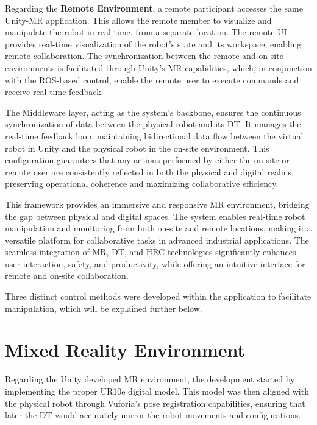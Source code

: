 Regarding the \textbf{Remote Environment}, a remote participant accesses the same Unity-\ac{MR} application. This allows the remote member to visualize and manipulate the robot in real time, from a separate location. The remote \ac{UI} provides real-time visualization of the robot’s state and its workspace, enabling remote collaboration. The synchronization between the remote and on-site environments is facilitated through Unity’s \ac{MR} capabilities, which, in conjunction with the \ac{ROS}-based control, enable the remote user to execute commands and receive real-time feedback.

The Middleware layer, acting as the system’s backbone, ensures the continuous synchronization of data between the physical robot and its \ac{DT}. It manages the real-time feedback loop, maintaining bidirectional data flow between the virtual robot in Unity and the physical robot in the on-site environment. This configuration guarantees that any actions performed by either the on-site or remote user are consistently reflected in both the physical and digital realms, preserving operational coherence and maximizing collaborative efficiency.

This framework provides an immersive and responsive \ac{MR} environment, bridging the gap between physical and digital spaces. The system enables real-time robot manipulation and monitoring from both on-site and remote locations, making it a versatile platform for collaborative tasks in advanced industrial applications. The seamless integration of \ac{MR}, \ac{DT}, and \ac{HRC} technologies significantly enhances user interaction, safety, and productivity, while offering an intuitive interface for remote and on-site collaboration.


Three distinct control methods were developed within the application to facilitate manipulation, which will be explained further below.


\section{Mixed Reality Environment}

Regarding the Unity developed \ac{MR} environment, the development started by implementing the proper UR10e digital model. This model was then aligned with the physical robot through Vuforia's pose registration capabilities, ensuring that later the \ac{DT} would accurately mirror the robot movements and configurations.

